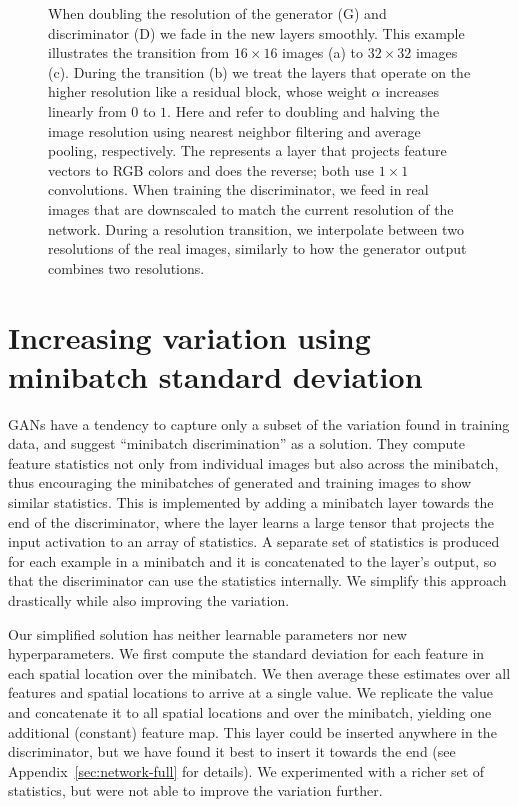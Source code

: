 \begin{figure}[t]
\centering

\caption{When doubling the resolution of the generator (\textsc{G}) and discriminator (\textsc{D}) we fade in the new layers smoothly. This example illustrates the transition from $16\times16$ images (a) to $32\times32$ images (c). During the transition (b) we treat the layers that operate on the higher resolution like a residual block, whose weight $\alpha$ increases linearly from $0$ to $1$. Here \framebox{\small $2\times$} and \framebox{\small $0.5\times$} refer to doubling and halving the image resolution using nearest neighbor filtering and average pooling, respectively. The  represents a layer that projects feature vectors to RGB colors and  does the reverse; both use $1\times1$ convolutions. 
When training the discriminator, we feed in real images that are downscaled to match the current resolution of the network. 
During a resolution transition, we interpolate between two resolutions of the real images, similarly to how the generator output combines two resolutions.
}
\label{fig:fadein}
\end{figure}

\section{Increasing variation using minibatch standard deviation}
\label{sec:variation}

GANs have a tendency to capture only a subset of the variation found in training data, and \cite{Salimans2016B} suggest ``minibatch discrimination'' as a solution. They compute feature statistics not only from individual images but also across the minibatch, thus encouraging the minibatches of generated and training images to show similar statistics. This is implemented by adding a minibatch layer towards the end of the discriminator, where the layer learns a large tensor that projects the input activation to an array of statistics. A separate set of statistics is produced for each example in a minibatch and it is concatenated to the layer's output, so that the discriminator can use the statistics internally. We simplify this approach drastically while also improving the variation.

Our simplified solution has neither learnable parameters nor new hyperparameters. We first compute the standard deviation for each feature in each spatial location over the minibatch. We then average these estimates over all features and spatial locations to arrive at a single value. We replicate the value and concatenate it to all spatial locations and over the minibatch, yielding one additional (constant) feature map. This layer could be inserted anywhere in the discriminator, but we have found it best to insert it towards the end (see Appendix~\ref{sec:network-full} for details).  We experimented with a richer set of statistics, but were not able to improve the variation further.

